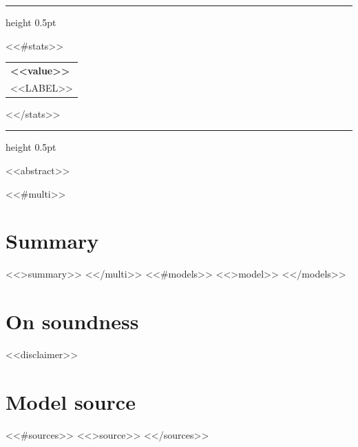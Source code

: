 \documentclass[11pt,a4paper]{article}
\makeatletter
\newcommand{\vpstat}[3]{%
  \begin{tabular}[t]{@{}l@{}}%
    {\sffamily\bfseries\LARGE\color{#3}#1}\\[0.2ex]%
    {\sffamily\scriptsize\color{vpslate}\MakeUppercase{#2}}%
  \end{tabular}\hspace{2.6em}}
\makeatother
\begin{document}
\thispagestyle{plain}

\par
\vspace{0.9ex}
\par
\vspace{1.1ex}
\par
\vspace{2.4ex}
{\color{vprule}\hrule height 0.5pt}
\vspace{2ex}
\noindent<<#stats>>\vpstat{<<value>>}{<<label>>}{<<#alert>>vpaccent<</alert>><<^alert>>vpink<</alert>>}<</stats>>\par
\vspace{2ex}
{\color{vprule}\hrule height 0.5pt}
\vspace{2.4ex}

\noindent <<abstract>>

<<#multi>>
\section{Summary}
<<>summary>>
<</multi>>
<<#models>>
<<>model>>
<</models>>

\appendix
\section{On soundness}
\noindent <<disclaimer>>

\section{Model source}
<<#sources>>
<<>source>>
<</sources>>
\end{document}

